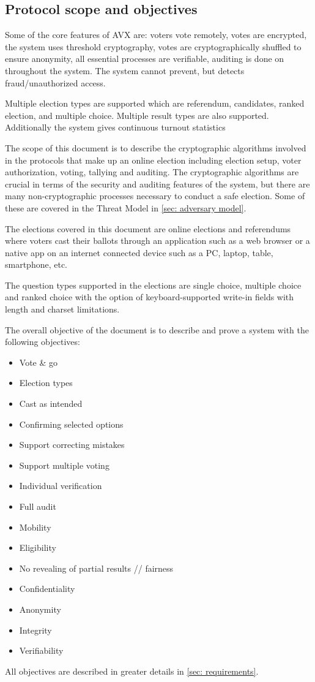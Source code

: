 \subsection{Protocol scope and objectives}
Some of the core features of AVX are: voters vote remotely, votes are encrypted, the system uses threshold cryptography, votes are cryptographically shuffled to ensure anonymity, all essential processes are verifiable, auditing is done on throughout the system. The system cannot prevent, but detects fraud/unauthorized access.

Multiple election types are supported which are referendum, candidates, ranked election, and multiple choice. Multiple result types are also supported. Additionally the system gives continuous turnout statistics

The scope of this document is to describe the cryptographic algorithms involved in the protocols that make up an online election including election setup, voter authorization, voting, tallying and auditing. The cryptographic algorithms are crucial in terms of the security and auditing features of the system, but there are many non-cryptographic processes necessary to conduct a safe election. Some of these are covered in the Threat Model in \cref{sec: adversary model}.

The elections covered in this document are online elections and referendums where voters cast their ballots through an application such as a web browser or a native app on an internet connected device such as a PC, laptop, table, smartphone, etc.

The question types supported in the elections are single choice, multiple choice and ranked choice with the option of keyboard-supported write-in fields with length and charset limitations.

The overall objective of the document is to describe and prove a system with the following objectives:

\begin{itemize}
    \item Vote \& go
    \item Election types
    \item Cast as intended
    \item Confirming selected options
    \item Support correcting mistakes
    \item Support multiple voting
    \item Individual verification
    \item Full audit

    \item Mobility

    \item Eligibility
    \item No revealing of partial results // fairness
    \item Confidentiality
    \item Anonymity
    \item Integrity
    \item Verifiability
\end{itemize}

All objectives are described in greater details in \cref{sec: requirements}.
